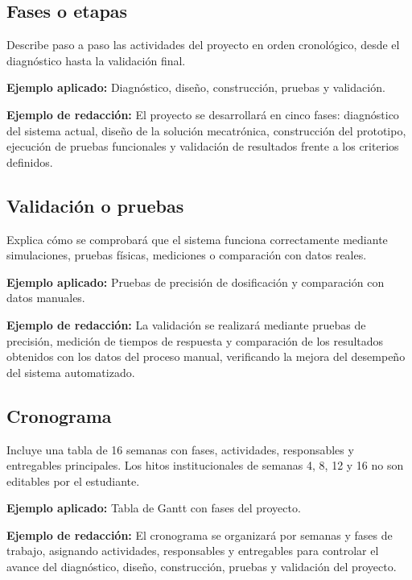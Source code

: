 \documentclass[12pt,letterpaper]{report}
\begin{document}
\subsection{Fases o etapas}
\begin{instrucciones}
Describe paso a paso las actividades del proyecto en orden cronológico, desde el diagnóstico hasta la validación final.

\vspace{2mm}
\noindent \textbf{Ejemplo aplicado:} Diagnóstico, diseño, construcción, pruebas y validación.

\vspace{2mm}
\noindent \textbf{Ejemplo de redacción:} El proyecto se desarrollará en cinco fases: diagnóstico del sistema actual, diseño de la solución mecatrónica, construcción del prototipo, ejecución de pruebas funcionales y validación de resultados frente a los criterios definidos.
\end{instrucciones}

\subsection{Validación o pruebas}
\begin{instrucciones}
Explica cómo se comprobará que el sistema funciona correctamente mediante simulaciones, pruebas físicas, mediciones o comparación con datos reales.

\vspace{2mm}
\noindent \textbf{Ejemplo aplicado:} Pruebas de precisión de dosificación y comparación con datos manuales.

\vspace{2mm}
\noindent \textbf{Ejemplo de redacción:} La validación se realizará mediante pruebas de precisión, medición de tiempos de respuesta y comparación de los resultados obtenidos con los datos del proceso manual, verificando la mejora del desempeño del sistema automatizado.
\end{instrucciones}

\subsection{Cronograma}
\begin{instrucciones}
Incluye una tabla de 16 semanas con fases, actividades, responsables y entregables principales. Los hitos institucionales de semanas 4, 8, 12 y 16 no son editables por el estudiante.

\vspace{2mm}
\noindent \textbf{Ejemplo aplicado:} Tabla de Gantt con fases del proyecto.

\vspace{2mm}
\noindent \textbf{Ejemplo de redacción:} El cronograma se organizará por semanas y fases de trabajo, asignando actividades, responsables y entregables para controlar el avance del diagnóstico, diseño, construcción, pruebas y validación del proyecto.
\end{instrucciones}
\end{document}
